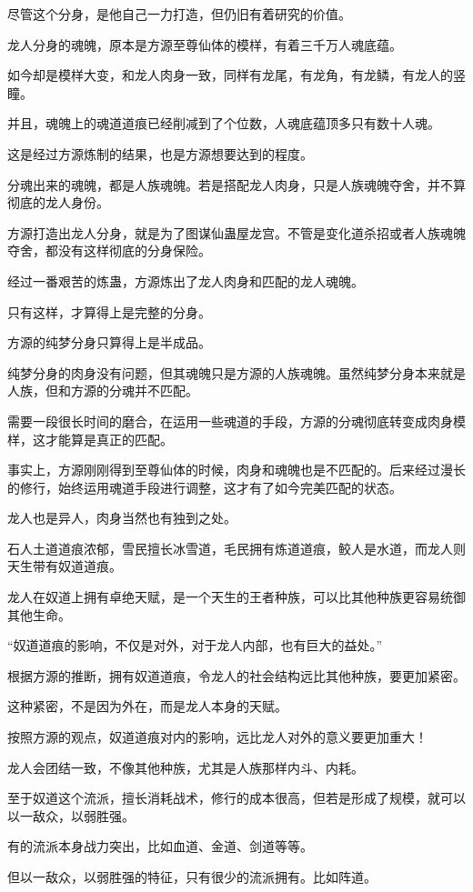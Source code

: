 \begin{this_body}
尽管这个分身，是他自己一力打造，但仍旧有着研究的价值。

龙人分身的魂魄，原本是方源至尊仙体的模样，有着三千万人魂底蕴。

如今却是模样大变，和龙人肉身一致，同样有龙尾，有龙角，有龙鳞，有龙人的竖瞳。

并且，魂魄上的魂道道痕已经削减到了个位数，人魂底蕴顶多只有数十人魂。

这是经过方源炼制的结果，也是方源想要达到的程度。

分魂出来的魂魄，都是人族魂魄。若是搭配龙人肉身，只是人族魂魄夺舍，并不算彻底的龙人身份。

方源打造出龙人分身，就是为了图谋仙蛊屋龙宫。不管是变化道杀招或者人族魂魄夺舍，都没有这样彻底的分身保险。

经过一番艰苦的炼蛊，方源炼出了龙人肉身和匹配的龙人魂魄。

只有这样，才算得上是完整的分身。

方源的纯梦分身只算得上是半成品。

纯梦分身的肉身没有问题，但其魂魄只是方源的人族魂魄。虽然纯梦分身本来就是人族，但和方源的分魂并不匹配。

需要一段很长时间的磨合，在运用一些魂道的手段，方源的分魂彻底转变成肉身模样，这才能算是真正的匹配。

事实上，方源刚刚得到至尊仙体的时候，肉身和魂魄也是不匹配的。后来经过漫长的修行，始终运用魂道手段进行调整，这才有了如今完美匹配的状态。

龙人也是异人，肉身当然也有独到之处。

石人土道道痕浓郁，雪民擅长冰雪道，毛民拥有炼道道痕，鲛人是水道，而龙人则天生带有奴道道痕。

龙人在奴道上拥有卓绝天赋，是一个天生的王者种族，可以比其他种族更容易统御其他生命。

“奴道道痕的影响，不仅是对外，对于龙人内部，也有巨大的益处。”

根据方源的推断，拥有奴道道痕，令龙人的社会结构远比其他种族，要更加紧密。

这种紧密，不是因为外在，而是龙人本身的天赋。

按照方源的观点，奴道道痕对内的影响，远比龙人对外的意义要更加重大！

龙人会团结一致，不像其他种族，尤其是人族那样内斗、内耗。

至于奴道这个流派，擅长消耗战术，修行的成本很高，但若是形成了规模，就可以以一敌众，以弱胜强。

有的流派本身战力突出，比如血道、金道、剑道等等。

但以一敌众，以弱胜强的特征，只有很少的流派拥有。比如阵道。


\end{this_body}
